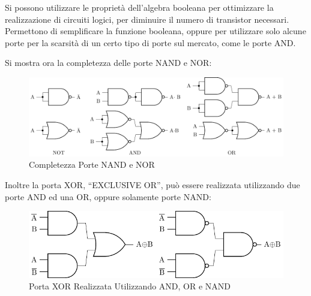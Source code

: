 \documentclass{article}
\numberwithin{equation}{subsection}
\begin{document}
Si possono utilizzare le proprietà dell'algebra booleana per ottimizzare la realizzazione di circuiti logici, per diminuire il numero di transistor necessari. Permettono di semplificare la funzione booleana, oppure 
per utilizzare solo alcune porte per la scarsità di un certo tipo di porte sul mercato, come le porte AND. 

Si mostra ora la completezza delle porte NAND e NOR:
\begin{figure}[H]%
    \centering%
    \includegraphics[scale=0.8]{completezza-nand-nor.pdf}%
    \caption{Completezza Porte NAND e NOR}%
\end{figure}


Inoltre la porta XOR, ``EXCLUSIVE OR'', può essere realizzata utilizzando due porte AND ed una OR, oppure solamente porte NAND:
\begin{figure}[H]%
    \centering%
    \includegraphics[scale=0.8]{porta-xor.pdf}%
    \caption{Porta XOR Realizzata Utilizzando AND, OR e NAND}%
\end{figure}
\end{document}
